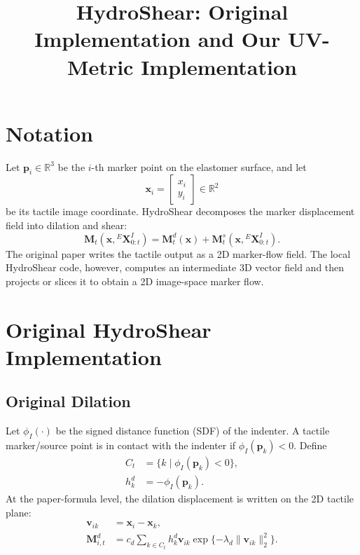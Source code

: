 \documentclass[11pt]{article}
\title{HydroShear: Original Implementation and Our UV-Metric Implementation}
\author{}
\date{}
\newcommand{\R}{\mathbb{R}}
\begin{document}
\maketitle

\section{Notation}

Let $\mathbf{p}_i \in \R^3$ be the $i$-th marker point on the elastomer
surface, and let
\begin{equation}
    \mathbf{x}_i =
    \begin{bmatrix}
        x_i \\
        y_i
    \end{bmatrix}
    \in \R^2
\end{equation}
be its tactile image coordinate. HydroShear decomposes the marker displacement
field into dilation and shear:
\begin{equation}
    \mathbf{M}_t(\mathbf{x},{}^E\mathbf{X}^I_{0:t})
    =
    \mathbf{M}^d_t(\mathbf{x})
    +
    \mathbf{M}^s_t(\mathbf{x},{}^E\mathbf{X}^I_{0:t}).
    \label{eq:field-decomposition}
\end{equation}
The original paper writes the tactile output as a 2D marker-flow field. The
local HydroShear code, however, computes an intermediate 3D vector field and
then projects or slices it to obtain a 2D image-space marker flow.

\section{Original HydroShear Implementation}

\subsection{Original Dilation}

Let $\phi_I(\cdot)$ be the signed distance function (SDF) of the indenter.
A tactile marker/source point is in contact with the indenter if
$\phi_I(\mathbf{p}_k)<0$. Define
\begin{align}
    C_t
    &=
    \{k \mid \phi_I(\mathbf{p}_k)<0\}, \\
    h^d_k
    &=
    -\phi_I(\mathbf{p}_k).
\end{align}
At the paper-formula level, the dilation displacement is written on the 2D
tactile plane:
\begin{align}
    \mathbf{v}_{ik}
    &=
    \mathbf{x}_i-\mathbf{x}_k, \\
    \mathbf{M}^{d}_{i,t}
    &=
    c_d
    \sum_{k\in C_t}
    h^d_k
    \mathbf{v}_{ik}
    \exp\{-\lambda_d\|\mathbf{v}_{ik}\|_2^2\}.
    \label{eq:original-paper-dilation}
\end{align}
\end{document}
